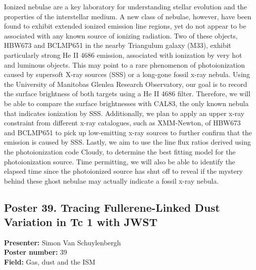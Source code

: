 Ionized nebulae are a key laboratory for understanding stellar evolution and the properties of the interstellar medium. A new class of nebulae, however, have been found to exhibit extended ionized emission line regions, yet do not appear to be associated with any known source of ionizing radiation. Two of these objects, HBW673 and BCLMP651 in the nearby Triangulum galaxy (M33), exhibit particularly strong He II 4686 emission, associated with ionization by very hot and luminous objects. This may point to a rare phenomenon of photoionization caused by supersoft X-ray sources (SSS) or a long-gone fossil x-ray nebula. Using the University of Manitobas Glenlea Research Observatory, our goal is to record the surface brightness of both targets using a He II 4686 filter. Therefore, we will be able to compare the surface brightnesses with CAL83, the only known nebula that indicates ionization by SSS. Additionally, we plan to apply an upper x-ray constraint from different x-ray catalogues, such as XMM-Newton, of HBW673 and BCLMP651 to pick up low-emitting x-ray sources to further confirm that the emission is caused by SSS. Lastly, we aim to use the line flux ratios derived using the photoionization code Cloudy, to determine the best fitting model for the photoionization source. Time permitting, we will also be able to identify the elapsed time since the photoionized source has shut off to reveal if the mystery behind these ghost nebulae may actually indicate a fossil x-ray nebula.

\hypertarget{poster-abstract-talk-314}{}\label{poster-abstract-page-talk-314}
\subsection*{Poster 39. Tracing Fullerene-Linked Dust Variation in Tc 1 with JWST}
\textbf{Presenter:} Simon Van Schuylenbergh\\
\textbf{Poster number:} 39\\
\textbf{Field:} Gas, dust and the ISM

